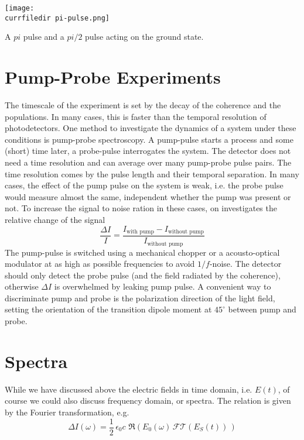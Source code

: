 \begin{marginfigure}
\texttt{[image: \\currfiledir pi-pulse.png]}
\caption{A $pi$ pulse and a $pi/2$ pulse acting on the ground state.}
\end{marginfigure}

\section{Pump-Probe Experiments}

The timescale of the experiment is set by the decay of the coherence and the populations. In many cases, this is faster than the temporal resolution of photodetectors. One method to investigate the dynamics of a system under these conditions is pump-probe spectroscopy. A pump-pulse starts a process and some (short) time later, a probe-pulse interrogates the system. The detector does not need a time resolution and can average over many pump-probe pulse pairs. The time resolution comes by the pulse length and their temporal separation. In many cases, the effect of the pump pulse on the system is weak, i.e. the probe pulse would measure almost the same, independent whether the pump was present or not. To increase the signal to noise ration in these cases, on investigates the relative change of the signal
\begin{equation}
 \frac{\Delta I}{I} = \frac{I_\text{with pump} - I_\text{without pump} }{I_\text{without pump}}
\end{equation}
The pump-pulse is switched using a mechanical chopper or a acousto-optical modulator at as high as possible frequencies to avoid $1/f$-noise. The detector should only detect the probe pulse (and the field radiated by the coherence), otherwise $\Delta I$ is overwhelmed by leaking pump pulse. A convenient way to discriminate pump and probe is the polarization direction of the light field, setting the orientation of the transition dipole moment at $45^\circ$ between pump and probe.



\section{Spectra}

While we have discussed above the electric fields in time domain, i.e. $E(t)$, of course we could also discuss frequency domain, or spectra. The relation is given by the Fourier transformation, e.g.
\begin{equation}
\Delta I (\omega) = \frac{1}{2} \, \epsilon_0 c \, \, \Re \left( E_0(\omega) \, \mathcal{FT} ( E_S(t) ) \, \right)
\end{equation}


\printbibliography[segment=\therefsegment,heading=subbibliography]
